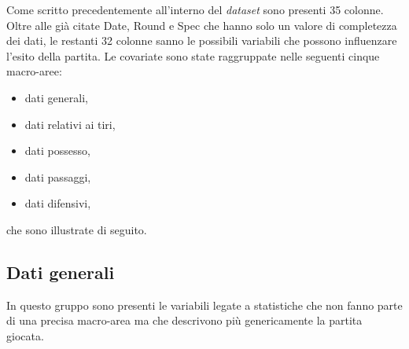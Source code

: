 Come scritto precedentemente all'interno del \emph{dataset} sono presenti 35 colonne. Oltre alle già citate \textsf{Date}, \textsf{Round} e \textsf{Spec} che hanno solo un valore di completezza dei dati, le restanti 32 colonne sanno le possibili variabili che possono influenzare l'esito della partita.
Le covariate sono state raggruppate nelle seguenti cinque macro-aree:
\begin{itemize}
	\item dati generali,
	\item dati relativi ai tiri,
	\item dati possesso,
	\item dati passaggi,
	\item dati difensivi,
\end{itemize}

che sono illustrate di seguito.

\subsection{Dati generali}
In questo gruppo sono presenti le variabili legate a statistiche che non fanno parte di una precisa macro-area ma che descrivono più genericamente la partita giocata. 

